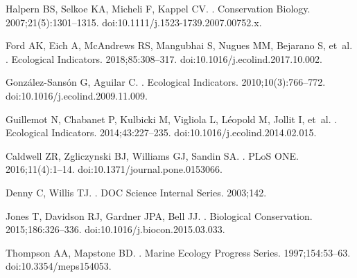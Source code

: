 \documentclass[10pt,letterpaper]{article}
\begin{document}
\begin{thebibliography}{10}

Halpern BS, Selkoe KA, Micheli F, Kappel CV.
.
\newblock Conservation Biology. 2007;21(5):1301--1315.
\newblock doi:{10.1111/j.1523-1739.2007.00752.x}.

Ford AK, Eich A, McAndrews RS, Mangubhai S, Nugues MM, Bejarano S, et~al.
.
\newblock Ecological Indicators. 2018;85:308--317.
\newblock doi:{10.1016/j.ecolind.2017.10.002}.

Gonz{\'{a}}lez-Sans{\'{o}}n G, Aguilar C.
.
\newblock Ecological Indicators. 2010;10(3):766--772.
\newblock doi:{10.1016/j.ecolind.2009.11.009}.

Guillemot N, Chabanet P, Kulbicki M, Vigliola L, L{\'{e}}opold M, Jollit I,
  et~al.
.
\newblock Ecological Indicators. 2014;43:227--235.
\newblock doi:{10.1016/j.ecolind.2014.02.015}.

Caldwell ZR, Zgliczynski BJ, Williams GJ, Sandin SA.
.
\newblock PLoS ONE. 2016;11(4):1--14.
\newblock doi:{10.1371/journal.pone.0153066}.

Denny C, Willis TJ.
.
\newblock DOC Science Internal Series. 2003;142.

Jones T, Davidson RJ, Gardner JPA, Bell JJ.
.
\newblock Biological Conservation. 2015;186:326--336.
\newblock doi:{10.1016/j.biocon.2015.03.033}.

Thompson AA, Mapstone BD.
.
\newblock Marine Ecology Progress Series. 1997;154:53--63.
\newblock doi:{10.3354/meps154053}.


\end{thebibliography}
\end{document}
